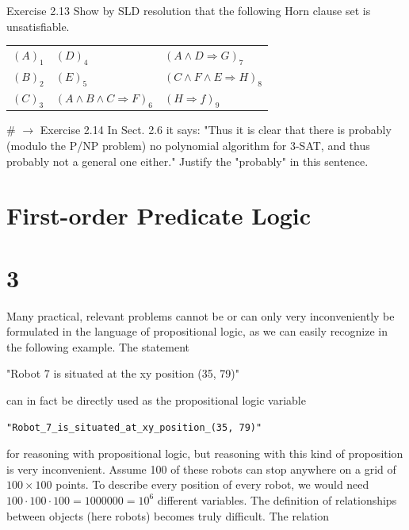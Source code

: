 \documentclass[10pt]{article}
\begin{document}
Exercise 2.13 Show by SLD resolution that the following Horn clause set is unsatisfiable.

\begin{center}
\begin{tabular}{lll}
$(A)_{1}$ & $(D)_{4}$ & $(A \wedge D \Rightarrow G)_{7}$ \\
$(B)_{2}$ & $(E)_{5}$ & $(C \wedge F \wedge E \Rightarrow H)_{8}$ \\
$(C)_{3}$ & $(A \wedge B \wedge C \Rightarrow F)_{6}$ & $(H \Rightarrow f)_{9}$ \\
\end{tabular}
\end{center}

\# $\rightarrow$ Exercise 2.14 In Sect. 2.6 it says: "Thus it is clear that there is probably (modulo the P/NP problem) no polynomial algorithm for 3-SAT, and thus probably not a general one either." Justify the "probably" in this sentence.

\section*{First-order Predicate Logic}
\section*{3}
Many practical, relevant problems cannot be or can only very inconveniently be formulated in the language of propositional logic, as we can easily recognize in the following example. The statement


\begin{displayquote}
"Robot 7 is situated at the xy position (35, 79)"
\end{displayquote}

can in fact be directly used as the propositional logic variable

\begin{verbatim}
"Robot_7_is_situated_at_xy_position_(35, 79)"
\end{verbatim}

for reasoning with propositional logic, but reasoning with this kind of proposition is very inconvenient. Assume 100 of these robots can stop anywhere on a grid of $100 \times 100$ points. To describe every position of every robot, we would need $100 \cdot 100 \cdot 100=1000000=10^{6}$ different variables. The definition of relationships between objects (here robots) becomes truly difficult. The relation
\end{document}
